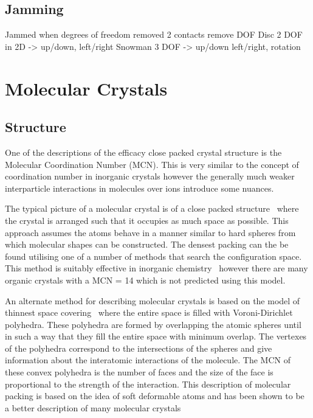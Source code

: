 \subsection{Jamming}
Jammed when degrees of freedom removed
2 contacts remove DOF
Disc 2 DOF in 2D -> up/down, left/right
Snowman 3 DOF -> up/down left/right, rotation


\section{Molecular Crystals}
\subsection{Structure}

One of the descriptions of the efficacy close packed crystal structure is the Molecular Coordination Number (MCN). This is very similar to the concept of coordination number in inorganic crystals however the generally much weaker interparticle interactions in molecules over ions introduce some nuances.

The typical picture of a molecular crystal is of a close packed structure~\cite{kitaigorodskii:73} where the crystal is arranged such that it occupies as much space as possible. This approach assumes the atoms behave in a manner similar to hard spheres from which molecular shapes can be constructed. The densest packing can the be found utilising one of a number of methods that search the configuration space. This method is suitably effective in inorganic chemistry~\cite{wells:73} however there are many organic crystals with a MCN = 14 which is not predicted using this model.

An alternate method for describing molecular crystals is based on the model of thinnest space covering~\cite{blatov:95} where the entire space is filled with Voroni-Dirichlet polyhedra. These polyhedra are formed by overlapping the atomic spheres until in such a way that they fill the entire space with minimum overlap. The vertexes of the polyhedra correspond to the intersections of the spheres and give information about the interatomic interactions of the molecule. The MCN of these convex polyhedra is the number of faces and the size of the face is proportional to the strength of the interaction. This description of molecular packing is based on the idea of soft deformable atoms and has been shown to be a better description of many molecular crystals~\cite{blatov:97,peresypkina:99,peresypkina:00}

